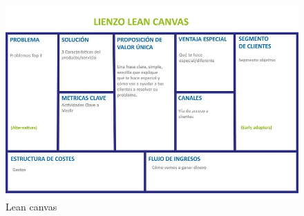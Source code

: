 \begin{figure}
\begin{center}
\includegraphics[scale=0.6]{imagenes/leanCanvas.jpg}
\caption{Lean canvas}
\label{leanCanvas}
\end{center}
\end{figure}




